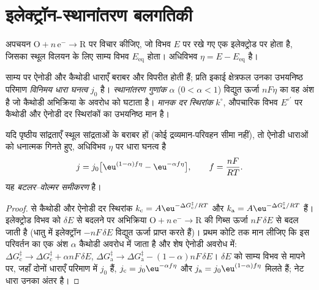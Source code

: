 \section{इलेक्ट्रॉन-स्थानांतरण बलगतिकी}

अपचयन $\mathrm{O} + n\,\mathrm{e}^- \to \mathrm{R}$ पर विचार कीजिए, जो विभव $E$ पर रखे गए एक इलेक्ट्रोड पर होता है,
जिसका स्थूल विलयन के लिए साम्य विभव $E_{\mathrm{eq}}$ होता।
अधिविभव $\eta = E - E_{\mathrm{eq}}$ है।

\begin{definition}\label{def:b3:electrode-kinetics:exchange}
साम्य पर ऐनोडी और कैथोडी धाराएँ बराबर और विपरीत होती हैं; प्रति इकाई क्षेत्रफल उनका
उभयनिष्ठ परिमाण \emph{विनिमय धारा
घनत्व} $j_0$ है। \emph{स्थानांतरण गुणांक}
 $\alpha$ ($0 < \alpha < 1$) विद्युत ऊर्जा $nF\eta$ का वह
अंश है जो कैथोडी अभिक्रिया के अवरोध को घटाता है।
\emph{मानक दर स्थिरांक} $k^\circ$, औपचारिक विभव $E^{\circ\prime}$ पर
कैथोडी और ऐनोडी दर स्थिरांकों का उभयनिष्ठ मान है।
\end{definition}

\begin{theorem}\label{thm:b3:electrode-kinetics:butler-volmer}
यदि पृष्ठीय सांद्रताएँ स्थूल सांद्रताओं के बराबर हों (कोई द्रव्यमान-परिवहन
सीमा नहीं), तो ऐनोडी धाराओं को धनात्मक गिनते हुए, अधिविभव $\eta$ पर धारा घनत्व
है
\[
  j = j_0\bigl[\eu^{(1 - \alpha)f\eta} - \eu^{-\alpha f\eta}\bigr], \qquad f = \frac{nF}{RT}.
\]
यह \emph{बटलर--वोल्मर समीकरण} है।
\end{theorem}

\begin{proof}
 से कैथोडी और ऐनोडी दर स्थिरांक
$k_{\mathrm c} = A\eu^{-\Delta G_{\mathrm c}^{\ddagger}/RT}$ और $k_{\mathrm a} = A\eu^{-\Delta G_{\mathrm a}^{\ddagger}/RT}$ हैं। इलेक्ट्रोड विभव को $\delta E$ से बदलने पर
अभिक्रिया $\mathrm{O} + n\,\mathrm{e}^- \to \mathrm{R}$ की गिब्स ऊर्जा $nF\,\delta E$ से बदल जाती है (धातु में इलेक्ट्रॉन
$-nF\,\delta E$ विद्युत ऊर्जा प्राप्त करते हैं)। प्रथम कोटि तक मान लीजिए कि इस परिवर्तन का एक
अंश $\alpha$ कैथोडी अवरोध में जाता है और शेष
ऐनोडी अवरोध में: $\Delta G_{\mathrm c}^{\ddagger} \to \Delta G_{\mathrm c}^{\ddagger} + \alpha nF\,\delta E$, $\Delta G_{\mathrm a}^{\ddagger} \to \Delta G_{\mathrm a}^{\ddagger} - (1 - \alpha)nF\,\delta E$। $\delta E$ को
साम्य विभव से मापने पर, जहाँ दोनों धाराएँ परिमाण में $j_0$
हैं, $j_{\mathrm c} = j_0\eu^{-\alpha f\eta}$ और $j_{\mathrm a} = j_0\eu^{(1 - \alpha)f\eta}$ मिलते हैं; नेट धारा उनका
अंतर है।
\end{proof}

